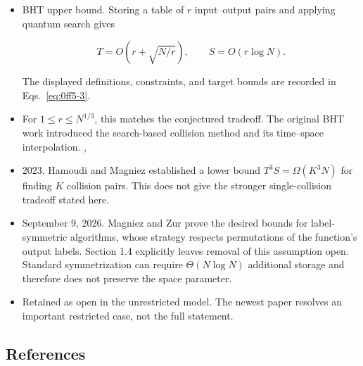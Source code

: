 \begin{itemize}
  \item BHT upper bound. Storing a table of $r$ input–output pairs and applying quantum search gives

\begin{equation}
T=O\!\left(r+\sqrt{N/r}\right),\qquad S=O(r\log N).
\label{eq:0ff5-3}
\end{equation}

The displayed definitions, constraints, and target bounds are recorded in Eqs.~\eqref{eq:0ff5-3}.

  \item For $1\le r\le N^{1/3}$, this matches the conjectured tradeoff. The original BHT work introduced the search-based collision method and its time–space interpolation. , 

  \item 2023. Hamoudi and Magniez established a lower bound $T^3S=\Omega(K^3N)$ for finding $K$ collision pairs. This does not give the stronger single-collision tradeoff stated here. 

  \item September 9, 2026. Magniez and Zur prove the desired bounds for label-symmetric algorithms, whose strategy respects permutations of the function's output labels. Section 1.4 explicitly leaves removal of this assumption open. Standard symmetrization can require $\Theta(N\log N)$ additional storage and therefore does not preserve the space parameter. 

  \item Retained as open in the unrestricted model. The newest paper resolves an important restricted case, not the full statement.
\end{itemize}

\subsection*{References}

